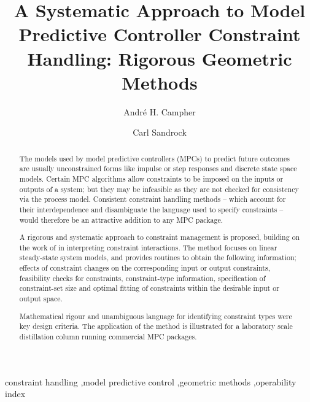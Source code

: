 \documentclass[final,authoryear,5pt,times,twocolumn]{elsarticle}
\begin{document}
\begin{frontmatter}

\title{A Systematic Approach to Model Predictive Controller Constraint Handling: Rigorous Geometric Methods}

\author{Andr\'e H. Campher}

\author{Carl Sandrock}


\address{Department of Chemical Engineering, University of Pretoria, Pretoria 0001, South Africa}

\begin{abstract}
The models used by model predictive controllers (MPCs) to predict future outcomes are usually unconstrained forms like impulse or step responses and discrete state space models. 
Certain MPC algorithms allow constraints  to be imposed on the inputs or outputs of a system; but they may be infeasible as they are not checked for consistency via the process model. 
Consistent constraint handling methods -- which account for their interdependence and disambiguate the language used to specify constraints -- would therefore be an attractive addition to any MPC package.

A rigorous and systematic approach to constraint management is proposed, building on the work of \citet{vinsonartoi} in interpreting constraint interactions. 
The method focuses on linear steady-state system models, and provides routines to obtain the following information; effects of constraint changes on the corresponding input or output constraints, feasibility checks for constraints, constraint-type information, specification of constraint-set size and optimal fitting of constraints within the desirable input or output space.

Mathematical rigour and unambiguous language for identifying constraint types were key design criteria. 
The application of the method is illustrated for a laboratory scale distillation column running commercial MPC packages.
\end{abstract}

\begin{keyword}
constraint handling \sep model predictive control \sep geometric methods \sep operability index
\end{keyword}

\end{frontmatter}
\end{document}
